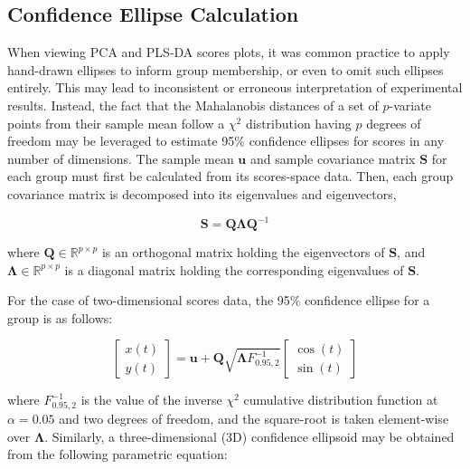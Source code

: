 \subsection{Confidence Ellipse Calculation}

\begin{doublespace}
When viewing PCA and PLS-DA scores plots, it was common practice to apply
hand-drawn ellipses to inform group membership, or even to omit such ellipses
entirely. This may lead to inconsistent or erroneous interpretation of
experimental results. Instead, the fact that the Mahalanobis distances of a
set of $p$-variate points from their sample mean follow a $\chi^2$ distribution
having $p$ degrees of freedom \cite{hotelling:ams1931} may be leveraged
to estimate 95\% confidence ellipses for scores in any number of dimensions.
The sample mean $\mathbf{u}$ and sample covariance matrix $\mathbf{S}$ for each
group must first be calculated from its scores-space data. Then, each group
covariance matrix is decomposed into its eigenvalues and eigenvectors,

\begin{equation}
\mathbf{S} = \mathbf{Q} \mathbf{\Lambda} \mathbf{Q}^{-1}
\end{equation}

where $\mathbf{Q} \in \mathbb{R}^{p \times p}$ is an orthogonal matrix holding
the eigenvectors of $\mathbf{S}$, and
$\mathbf{\Lambda} \in \mathbb{R}^{p \times p}$ is a diagonal matrix holding the
corresponding eigenvalues of $\mathbf{S}$.

For the case of two-dimensional scores data, the 95\% confidence ellipse for a
group is as follows:
\end{doublespace}

\begin{equation}
\begin{bmatrix}
x(t) \\
y(t)
\end{bmatrix}
 = \mathbf{u} + \mathbf{Q} \sqrt{\mathbf{\Lambda} F_{0.95,2}^{-1}}
\begin{bmatrix}
\cos(t) \\
\sin(t)
\end{bmatrix}
\end{equation}

\begin{doublespace}
where $F_{0.95,2}^{-1}$ is the value of the inverse $\chi^2$ cumulative
distribution function at $\alpha = 0.05$ and two degrees of freedom, and the
square-root is taken element-wise over $\mathbf{\Lambda}$. Similarly, a
three-dimensional (3D) confidence ellipsoid may be obtained from the
following parametric equation:
\end{doublespace}

